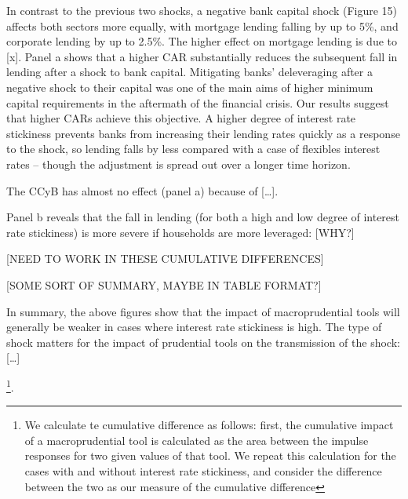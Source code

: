 \documentclass[12pt]{article}
\numberwithin{equation}{section}
\begin{document}
In contrast to the previous two shocks, a negative bank capital shock (Figure 15) affects both sectors more equally, with mortgage lending falling by up to 5\%, and corporate lending by up to 2.5\%. The higher effect on mortgage lending is due to [x]. Panel a shows that a higher CAR substantially reduces the subsequent fall in lending after a shock to bank capital. Mitigating banks’ deleveraging after a negative shock to their capital was one of the main aims of higher minimum capital requirements in the aftermath of the financial crisis. Our results suggest that higher CARs achieve this objective. A higher degree of interest rate stickiness prevents banks from increasing their lending rates quickly as a response to the shock, so lending falls by less compared with a case of flexibles interest rates – though the adjustment is spread out over a longer time horizon.

The CCyB has almost no effect (panel a) because of […].

Panel b reveals that the fall in lending (for both a high and low degree of interest rate stickiness) is more severe if households are more leveraged: [WHY?]

 

 

[NEED TO WORK IN THESE CUMULATIVE DIFFERENCES]

[SOME SORT OF SUMMARY, MAYBE IN TABLE FORMAT?]

In summary, the above figures show that the impact of macroprudential tools will generally be weaker in cases where interest rate stickiness is high. The type of shock matters for the impact of prudential tools on the transmission of the shock: […]


\footnote{We calculate te cumulative difference as follows: first, the cumulative impact of a macroprudential tool is calculated as the area between  the impulse responses for two given values of that tool. We repeat this calculation for the cases with and without interest rate stickiness, and consider the difference between the two as our measure of the cumulative difference}. 

\end{document}
